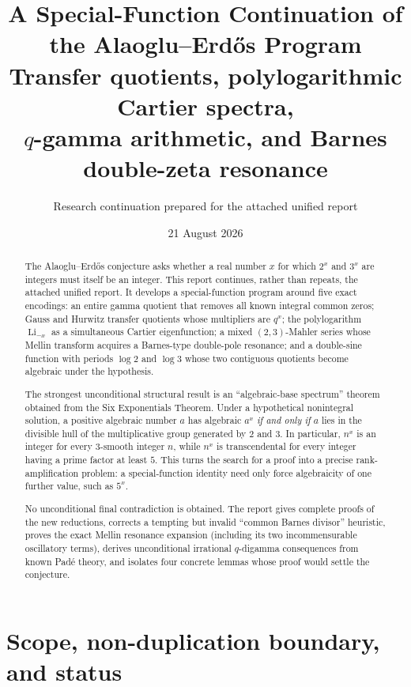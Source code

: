 \documentclass[11pt]{article}
\title{\textbf{A Special-Function Continuation of the Alaoglu--Erd\H{o}s Program}\\[2mm]
\large Transfer quotients, polylogarithmic Cartier spectra,\\
$q$-gamma arithmetic, and Barnes double-zeta resonance}
\author{Research continuation prepared for the attached unified report}
\date{21 August 2026}
\numberwithin{equation}{section}
\theoremstyle{definition}
\theoremstyle{remark}
\newcommand{\Li}{\operatorname{Li}}
\begin{document}
\sloppy
\maketitle

\begin{abstract}
The Alaoglu--Erd\H{o}s conjecture asks whether a real number $x$ for which $2^x$ and $3^x$ are integers must itself be an integer.  This report continues, rather than repeats, the attached unified report.  It develops a special-function program around five exact encodings: an entire gamma quotient that removes all known integral common zeros; Gauss and Hurwitz transfer quotients whose multipliers are $q^x$; the polylogarithm $\Li_{-x}$ as a simultaneous Cartier eigenfunction; a mixed $(2,3)$-Mahler series whose Mellin transform acquires a Barnes-type double-pole resonance; and a double-sine function with periods $\log 2$ and $\log 3$ whose two contiguous quotients become algebraic under the hypothesis.

The strongest unconditional structural result is an ``algebraic-base spectrum'' theorem obtained from the Six Exponentials Theorem.  Under a hypothetical nonintegral solution, a positive algebraic number $a$ has algebraic $a^x$ \emph{if and only if} $a$ lies in the divisible hull of the multiplicative group generated by $2$ and $3$.  In particular, $n^x$ is an integer for every $3$-smooth integer $n$, while $n^x$ is transcendental for every integer having a prime factor at least $5$.  This turns the search for a proof into a precise rank-amplification problem: a special-function identity need only force algebraicity of one further value, such as $5^x$.

No unconditional final contradiction is obtained.  The report gives complete proofs of the new reductions, corrects a tempting but invalid ``common Barnes divisor'' heuristic, proves the exact Mellin resonance expansion (including its two incommensurable oscillatory terms), derives unconditional irrational $q$-digamma consequences from known Pad\'e theory, and isolates four concrete lemmas whose proof would settle the conjecture.
\end{abstract}

\tableofcontents
\newpage

\section{Scope, non-duplication boundary, and status}
\label{sec:scope}
\end{document}
